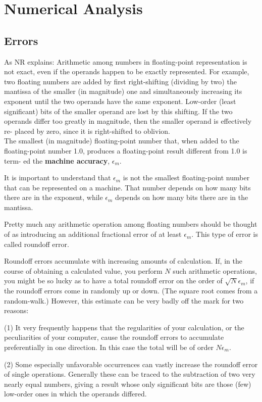 \section{Numerical Analysis}

\subsection{Errors}

As NR explains: Arithmetic among numbers in floating-point representation is not exact, even if
the operands happen to be exactly represented.
For example, two floating numbers are added by first right-shifting
(dividing by two) the mantissa of the smaller (in magnitude) one and simultaneously
increasing its exponent until the two operands have the same exponent. Low-order
(least significant) bits of the smaller operand are lost by this shifting. If the two
operands differ too greatly in magnitude, then the smaller operand is effectively re-
placed by zero, since it is right-shifted to oblivion.
\\

The smallest (in magnitude) floating-point number that, when added to the
floating-point number 1.0, produces a floating-point result different from 1.0 is term-
ed the \textbf{machine accuracy}, $\epsilon_m$.

It is important to understand that $\epsilon_m$ is not the smallest floating-point number
that can be represented on a machine.
That number depends on how many bits there
are in the exponent, while $\epsilon_m$ depends on how many bits there are in the mantissa.


Pretty much any
arithmetic operation among floating numbers should be thought of as introducing an
additional fractional error of at least $\epsilon_m$.
This type of error is called roundoff error.

Roundoff errors accumulate with increasing amounts of calculation. If, in the
course of obtaining a calculated value, you perform $N$ such arithmetic operations,
you might be so lucky as to have a total roundoff error on the order of $\sqrt{N}\epsilon_m$, if
the roundoff errors come in randomly up or down. (The square root comes from
a random-walk.) However, this estimate can be very badly off the mark for two
reasons:

(1) It very frequently happens that the regularities of your calculation, or the
peculiarities of your computer, cause the roundoff errors to accumulate preferentially
in one direction. In this case the total will be of order $N\epsilon_m$.

(2) Some especially unfavorable occurrences can vastly increase the roundoff
error of single operations. Generally these can be traced to the subtraction of two
very nearly equal numbers, giving a result whose only significant bits are those (few)
low-order ones in which the operands differed.